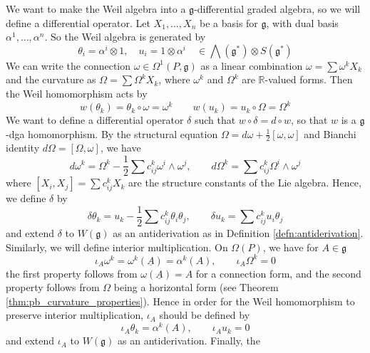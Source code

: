 We want to make the Weil algebra into a $\mathfrak{g}$-differential graded
algebra, so we will define a differential operator. Let $X_1,\ldots,X_n$ be a basis
for $\mathfrak{g}$, with dual basis  $\alpha^1,\ldots,\alpha^n$. So the Weil
algebra is generated by 
\begin{equation} \label{eq:weil_basis}
	 \theta_i = \alpha^i \otimes 1, \quad 
	 u_i = 1\otimes \alpha^i \quad\in \bigwedge(\mathfrak{g}^*)\otimes S(\mathfrak{g}^*)
\end{equation}
We can write the connection $\omega\in\Omega^1(P,\mathfrak{g})$ as a linear
combination $\omega = \sum \omega^kX_k$ and the curvature as $\Omega=\sum \Omega^kX_k$,
where  $\omega^k$ and  $\Omega^k$ are  $\mathbb{R}$-valued forms. 
Then the Weil homomorphism acts by 
\begin{equation} \label{eq:weil_homo}
w(\theta_k) = \theta_k\circ \omega = \omega^k
\qquad 
w(u_k) = u_k\circ \Omega = \Omega^k
\end{equation}
We want to define a differential operator $\delta$ such that  $w\circ \delta =
d\circ w$, so that $w$ is a  $\mathfrak{g}$-dga homomorphism. By the 
structural equation $\Omega=d\omega + \frac{1}{2}[\omega,\omega]$ and 
Bianchi identity $d\Omega=[\Omega,\omega]$, we have
\[
d\omega^k = \Omega^k - \frac{1}{2}\sum c_{ij}^k \omega^i\wedge \omega^j,
\qquad 
d\Omega^k = \sum c_{ij}^k \Omega^i\wedge \omega^j
\] 
where $[X_i,X_j]=\sum c_{ij}^kX_k$ are the structure constants of the Lie
algebra. Hence, we define $\delta$ by
\begin{equation} \label{eq:weil_differential}
\delta\theta_k = u_k - \frac{1}{2}\sum c_{ij}^k \theta_i\theta_j, \qquad
\delta u_k = \sum c_{ij}^k u_i\theta_j
\end{equation}
and extend $\delta$ to  $W(\mathfrak{g})$ as an antiderivation as in Definition
\ref{defn:antiderivation}. 
Similarly, we will define interior multiplication. On $\Omega(P)$, we have
for $A\in\mathfrak{g}$
\[
	 \iota_A \omega^k = \omega^k(\underline{A}) = \alpha^k(A), \qquad 
	 \iota_A \Omega^k = 0
\] 
the first property follows from $\omega(\underline{A})=A$ for a connection form,
and the second property follows from $\Omega$ being a horizontal form (see Theorem
\ref{thm:pb_curvature_properties}). Hence in order for the Weil homomorphism to 
preserve interior multiplication,  $\iota_A$ should be defined by
\begin{equation} \label{eq:weil_interior}
\iota_A \theta_k = \alpha^k(A), \qquad \iota_A u_k = 0
\end{equation}
and extend $\iota_A$ to  $W(\mathfrak{g})$ as an antiderivation. Finally, the
